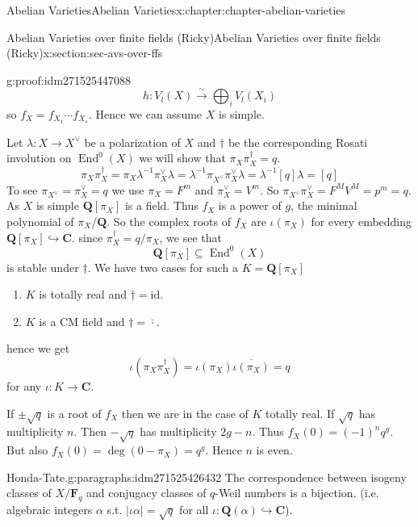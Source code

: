 \documentclass[oneside,10pt,]{book}
\numberwithin{equation}{section}
\newcommand{\lb}{[}
\newcommand{\rb}{]}
\newcommand{\QQ}{\mathbf{Q}}
\newcommand{\CC}{\mathbf{C}}
\newcommand{\FF}{\mathbf{F}}
\newcommand{\id}{\mathrm{id}}
\DeclareMathOperator{\End}{End}
\begin{document}
\begin{chapterptx}{Abelian Varieties}{}{Abelian Varieties}{}{}{x:chapter:chapter-abelian-varieties}
\begin{sectionptx}{Abelian Varieties over finite fields (Ricky)}{}{Abelian Varieties over finite fields (Ricky)}{}{}{x:section:sec-avs-over-ffs}
\begin{proofptx}{}{g:proof:idm271525447088}
\begin{equation*}
h\colon V_l(X)\xrightarrow{\sim} \bigoplus_i V_l(X_i)
\end{equation*}
so \(f_X = f_{X_1} \cdots f_{X_s}\). Hence we can assume \(X\) is simple.%
\par
Let \(\lambda \colon X \to X^\vee\) be a polarization of \(X\) and \(\dagger\) be the corresponding Rosati involution on \(\End^0(X)\) we will show that \(\pi_X\pi_X^\dagger = q\).%
\begin{equation*}
\pi_X \pi_X^\dagger = \pi_X \lambda^{-1} \pi_X^\vee \lambda = \lambda^{-1} \pi_{X^\vee} \pi_X^\vee \lambda = \lambda^{-1} \lb q \rb \lambda = \lb q \rb
\end{equation*}
To see \(\pi_{X^\vee} = \pi_X^\vee = q\) we use \(\pi_X = F^m\) and \(\pi_X^\vee = V^m \). So \(\pi_{X^\vee} \pi_X^\vee = F^MV^M = p^m = q\). As \(X\) is simple \(\QQ\lb \pi_X\rb\) is a field. Thus \(f_X\) is a power of \(g\), the minimal polynomial of \(\pi_X/\QQ\). So the complex roots of \(f_X\) are \(\iota(\pi_X)\)  for every embedding \(\QQ\lb \pi_X\rb\hookrightarrow \CC\). since \(\pi_X^\dagger = q/ \pi_X\), we see that%
\begin{equation*}
\QQ[\pi_X] \subseteq \End^0(X)
\end{equation*}
is stable under \(\dagger\). We have two cases for such a \(K = \QQ\lb \pi_X \rb \)%
\begin{enumerate}
\item{}\(K\) is  totally real and \(\dagger = \id\).%
\item{}\(K\) is a CM field and \(\dagger = \overline{\cdot}\).%
\end{enumerate}
hence we get%
\begin{equation*}
\iota(\pi_X\pi_X^\dagger) = \iota(\pi_X) \overline{\iota(\pi_X)} = q
\end{equation*}
for any \(\iota\colon K \to \CC\).%
\par
If \(\pm \sqrt q\) is  a root  of  \(f_X\) then we are in the case of \(K\) totally real. If \(\sqrt q\) has multiplicity \(n\). Then \(-\sqrt q\) has multiplicity \(2g-n\). Thus \(f_X(0) = (-1)^n   q^g\). But also \(f_X(0 ) = \deg(0 - \pi_X) = q^g\). Hence \(n \) is even.%
\end{proofptx}
\begin{paragraphs}{Honda-Tate.}{g:paragraphs:idm271525426432}%
The correspondence between isogeny classes of \(X/\FF_q\) and conjugacy classes of \(q\)-Weil numbers is a bijection. (i.e. algebraic integers \(\alpha\) s.t. \(|\iota \alpha| = \sqrt q\) for all \(\iota \colon \QQ(\alpha) \hookrightarrow \CC\)).%

\end{paragraphs}
\end{sectionptx}
\end{chapterptx}
\end{document}
